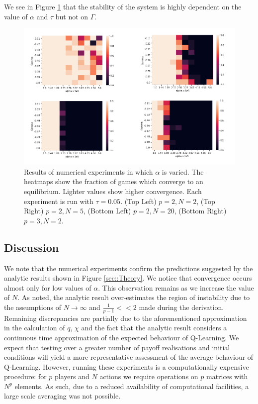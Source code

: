 \documentclass[sigconf]{aamas}
\begin{document}
We see in Figure \ref{fig:NumericalExperiments} that the stability of the system is highly dependent on
the value of $\alpha$ and $\tau$ but not on $\Gamma$.
   
\begin{figure}[t]
    \centering
    \includegraphics[width = 1.2 \linewidth]{Figures/Experiments.png}
    \caption{Results of numerical experiments in which $\alpha$ is varied. The heatmaps show the fraction of games which converge to an equilibrium. Lighter values show higher convergence. Each experiment is run with $\tau = 0.05$. (Top Left) $p = 2, N = 2$, (Top Right) $p = 2, N = 5$, (Bottom Left) $p = 2, N = 20$, (Bottom Right) $p=3, N = 2$.}
    \label{fig:NumericalExperiments}
\end{figure}


\subsection{Discussion}

We note that the numerical experiments confirm the predictions suggested by the analytic results shown in Figure \ref{sec::Theory}. We notice that convergence occurs almost only for low values of $\alpha$. This observation remains as we increase the value of $N$. As noted, the analytic result over-estimates the region of instability due to the assumptions of $N \rightarrow \infty$ and $\frac{1}{p-1} << 2$ made during the derivation. Remaining discrepancies are partially due to the aforementioned approximation in the calculation of $q$, $\chi$ and the fact that the analytic result considers a continuous time approximation of the expected behaviour of Q-Learning. We expect that testing over a greater number of payoff realisations and initial conditions will yield a more representative assessment of the average behaviour of Q-Learning. However, running these experiments is a computationally expensive procedure: for $p$ players and $N$ actions we require operations on $p$ matrices with $N^{p}$ elements. As such, due to a reduced availability of computational facilities, a large scale averaging was not possible.
\end{document}
